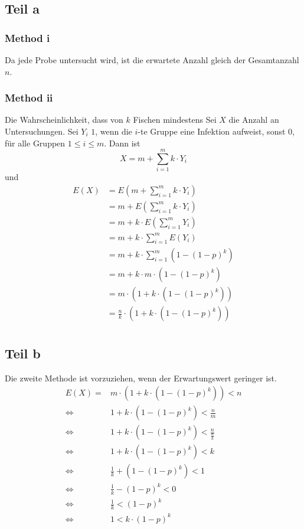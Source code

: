 \documentclass[10pt,a4paper]{article}
\begin{document}
\subsection{Teil a}

\subsubsection{Method i}
Da jede Probe untersucht wird, ist die erwartete Anzahl gleich der Gesamtanzahl $n$.

\subsubsection{Method ii}
Die Wahrscheinlichkeit, dass von $k$ Fischen mindestens
Sei $X$ die Anzahl an Untersuchungen.
Sei $Y_{i}$ $1$, wenn die $i$-te Gruppe eine Infektion aufweist, sonst $0$, für alle Gruppen $1 \le i \le m$.
Dann ist
\begin{equation}
  X = m + \sum_{i = 1}^{m} k \cdot Y_{i}
\end{equation}
und
\begin{align*}
  E(X) & = E(m + \sum_{i = 1}^{m} k \cdot Y_{i})\\
  & = m + E(\sum_{i = 1}^{m} k \cdot Y_{i})\\
  & = m + k \cdot E(\sum_{i = 1}^{m} Y_{i})\\
  & = m + k \cdot \sum_{i = 1}^{m} E(Y_{i})\\
  & = m + k \cdot \sum_{i = 1}^{m} \left( 1 - (1 - p)^{k} \right)\\
  & = m + k \cdot m \cdot \left( 1 - (1 - p)^{k} \right)\\
  & = m \cdot \left( 1 + k \cdot \left( 1 - (1 - p)^{k} \right) \right)\\
  & = \frac{n}{k} \cdot \left( 1 + k \cdot \left( 1 - (1 - p)^{k} \right) \right)\\
\end{align*}

\subsection{Teil b}
Die zweite Methode ist vorzuziehen, wenn der Erwartungswert geringer ist.
\begin{align*}
  E(X) = & m \cdot \left( 1 + k \cdot \left( 1 - (1 - p)^{k} \right) \right) < n\\
  \Leftrightarrow & 1 + k \cdot \left( 1 - (1 - p)^{k} \right) < \frac{n}{m}\\
  \Leftrightarrow & 1 + k \cdot \left( 1 - (1 - p)^{k} \right) < \frac{n}{\frac{n}{k}}\\
  \Leftrightarrow & 1 + k \cdot \left( 1 - (1 - p)^{k} \right) < k\\
  \Leftrightarrow & \frac{1}{k} + \left( 1 - (1 - p)^{k} \right) < 1\\
  \Leftrightarrow & \frac{1}{k} - (1 - p)^{k} < 0\\
  \Leftrightarrow & \frac{1}{k} < (1 - p)^{k}\\
  \Leftrightarrow & 1 < k \cdot (1 - p)^{k}\\
\end{align*}
\end{document}
